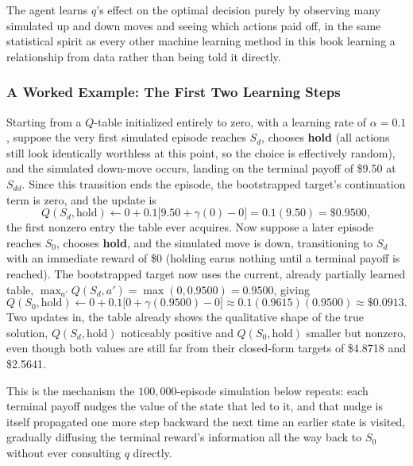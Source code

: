 \documentclass[../ai_in_finance]{subfiles}
\begin{document}
The agent learns $q$'s effect on the optimal decision purely by observing many simulated up and down moves and seeing which actions paid off, in the same statistical spirit as every other machine learning method in this book learning a relationship from data rather than being told it directly.

\subsubsection*{A Worked Example: The First Two Learning Steps}

Starting from a $Q$-table initialized entirely to zero, with a learning rate of $\alpha=0.1$, suppose the very first simulated episode reaches $S_d$, chooses \textbf{hold} (all actions still look identically worthless at this point, so the choice is effectively random), and the simulated down-move occurs, landing on the terminal payoff of \$9.50 at $S_{dd}$. Since this transition ends the episode, the bootstrapped target's continuation term is zero, and the update is
\begin{equation*}
Q(S_d,\text{hold}) \leftarrow 0 + 0.1\big[9.50 + \gamma(0) - 0\big] = 0.1(9.50) = \$0.9500,
\end{equation*}
the first nonzero entry the table ever acquires. Now suppose a later episode reaches $S_0$, chooses \textbf{hold}, and the simulated move is down, transitioning to $S_d$ with an immediate reward of \$0 (holding earns nothing until a terminal payoff is reached). The bootstrapped target now uses the current, already partially learned table, $\max_{a'}Q(S_d,a') = \max(0, 0.9500) = 0.9500$, giving
\begin{equation*}
Q(S_0,\text{hold}) \leftarrow 0 + 0.1\big[0 + \gamma(0.9500) - 0\big] \approx 0.1(0.9615)(0.9500) \approx \$0.0913.
\end{equation*}
Two updates in, the table already shows the qualitative shape of the true solution, $Q(S_d,\text{hold})$ noticeably positive and $Q(S_0,\text{hold})$ smaller but nonzero, even though both values are still far from their closed-form targets of \$4.8718 and \$2.5641.

This is the mechanism the $100{,}000$-episode simulation below repeats: each terminal payoff nudges the value of the state that led to it, and that nudge is itself propagated one more step backward the next time an earlier state is visited, gradually diffusing the terminal reward's information all the way back to $S_0$ without ever consulting $q$ directly.
\end{document}
